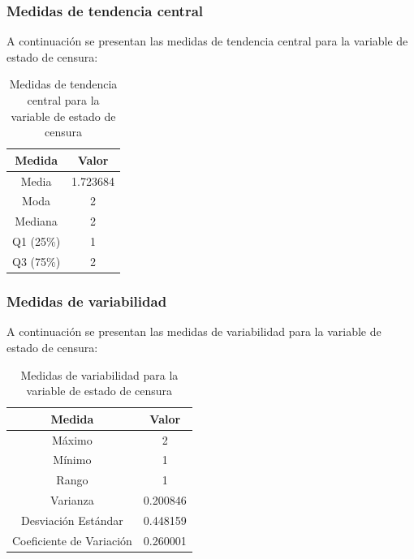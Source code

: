 \documentclass[a4paper,12pt]{article}
\begin{document}
    \subsubsection*{Medidas de tendencia central}

A continuación se presentan las medidas de tendencia central para la variable de estado de censura:

\begin{table}[h!]
    \centering
    \begin{tabular}{|c|c|}
        \hline
        \textbf{Medida} & \textbf{Valor} \\
        \hline
        Media & 1.723684 \\
        \hline
        Moda & 2 \\
        \hline
        Mediana & 2 \\
        \hline
        Q1 (25\%) & 1 \\
        \hline
        Q3 (75\%) & 2 \\
        \hline
    \end{tabular}
    \caption{Medidas de tendencia central para la variable de estado de censura}
    \label{tab:medidas_tendencia_central_status}
\end{table}

\subsubsection*{Medidas de variabilidad}

A continuación se presentan las medidas de variabilidad para la variable de estado de censura:

\begin{table}[h!]
    \centering
    \begin{tabular}{|c|c|}
        \hline
        \textbf{Medida} & \textbf{Valor} \\
        \hline
        Máximo & 2 \\
        \hline
        Mínimo & 1 \\
        \hline
        Rango & 1 \\
        \hline
        Varianza & 0.200846 \\
        \hline
        Desviación Estándar & 0.448159 \\
        \hline
        Coeficiente de Variación & 0.260001 \\
        \hline
    \end{tabular}
    \caption{Medidas de variabilidad para la variable de estado de censura}
    \label{tab:medidas_variabilidad_status}
\end{table}
\end{document}
